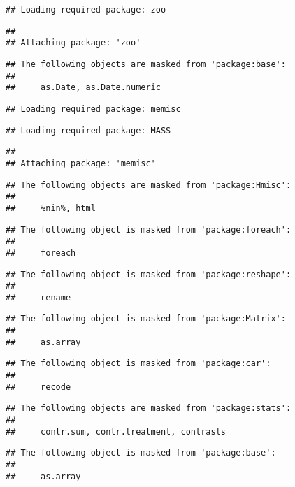 \documentclass[11pt,]{article}
\begin{document}
\begin{verbatim}
## Loading required package: zoo
\end{verbatim}

\begin{verbatim}
## 
## Attaching package: 'zoo'
\end{verbatim}

\begin{verbatim}
## The following objects are masked from 'package:base':
## 
##     as.Date, as.Date.numeric
\end{verbatim}

\begin{verbatim}
## Loading required package: memisc
\end{verbatim}

\begin{verbatim}
## Loading required package: MASS
\end{verbatim}

\begin{verbatim}
## 
## Attaching package: 'memisc'
\end{verbatim}

\begin{verbatim}
## The following objects are masked from 'package:Hmisc':
## 
##     %nin%, html
\end{verbatim}

\begin{verbatim}
## The following object is masked from 'package:foreach':
## 
##     foreach
\end{verbatim}

\begin{verbatim}
## The following object is masked from 'package:reshape':
## 
##     rename
\end{verbatim}

\begin{verbatim}
## The following object is masked from 'package:Matrix':
## 
##     as.array
\end{verbatim}

\begin{verbatim}
## The following object is masked from 'package:car':
## 
##     recode
\end{verbatim}

\begin{verbatim}
## The following objects are masked from 'package:stats':
## 
##     contr.sum, contr.treatment, contrasts
\end{verbatim}

\begin{verbatim}
## The following object is masked from 'package:base':
## 
##     as.array
\end{verbatim}
\end{document}
